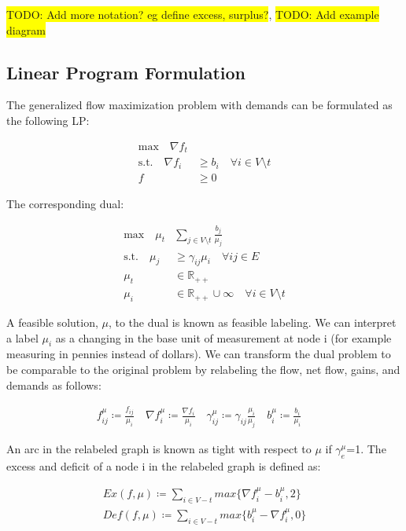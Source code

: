 \documentclass{article}
\newcommand{\todo}[1]{\colorbox{yellow}{TODO: #1}}
\begin{document}
    \todo{Add more notation? eg define excess, surplus?}, \todo{Add example diagram}
    
    \subsection{Linear Program Formulation}
    
    The generalized flow maximization problem with demands can be formulated as the following LP:
    
        \begin{align*}\tag{P}
        \text{max} \quad
        \nabla f_t& \\
        \text{s.t.} \quad
        \nabla f_i &\geq b_i \quad \forall i \in V \setminus t \\
        f &\geq 0
        \end{align*}        

\noindent The corresponding dual:
 
        \begin{align*}\tag{D}
        \text{max} \quad
        \mu_t &\sum_{j \in V \setminus t} \frac{b_j}{\mu_j}  \\
        \text{s.t.} \quad
        \mu_j &\geq \gamma_{ij}\mu_i \quad \forall ij \in E \\
        \mu_t &\in \mathbb{R}_{++} \\
        \mu_i &\in \mathbb{R}_{++} \cup \infty \quad \forall i \in V \setminus t
        \end{align*}  
        
A feasible solution, $\mu$, to the dual is known as feasible labeling. We can interpret a label $\mu_i$ as a changing in the base unit of measurement  at node i (for example measuring in pennies instead of dollars). We can transform the dual problem to be comparable to the original problem by relabeling the flow, net flow, gains, and demands as follows:

\begin{align*}
f_{ij}^\mu \coloneqq \frac{f_{ij}}{\mu_i} \quad
\nabla f_i^\mu \coloneqq \frac{\nabla f_i }{\mu_i} \quad
\gamma_{ij}^\mu \coloneqq \gamma_{ij} \frac{\mu_i}{\mu_j} \quad
b_i^\mu \coloneqq \frac{b_i}{\mu_i} \quad
\end{align*}

An arc in the relabeled graph is known as tight with respect to $\mu$ if $\gamma_e^\mu$=1. The excess and deficit of a node i in the relabeled graph is defined as:


\begin{align*}
Ex(f,\mu) \coloneqq \sum_{i \in V - t} max\{ \nabla	f_i^\mu - b_i^\mu, 2 \} \\
Def(f,\mu) \coloneqq \sum_{i \in V -t} max \{ b_i^\mu - \nabla f_i^\mu, 0\}
\end{align*}
\end{document}
